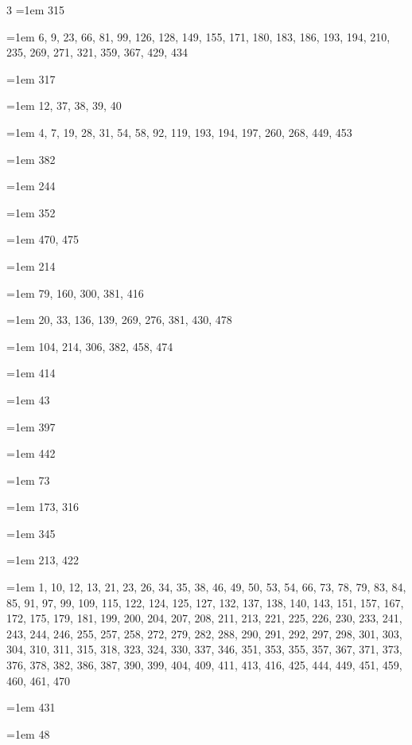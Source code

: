 \begin{multicols}{3}
\hangindent=1em  315\par
\hangindent=1em  6, 9, 23, 66, 81, 99, 126, 128, 149, 155, 171, 180, 183, 186, 193, 194, 210, 235, 269, 271, 321, 359, 367, 429, 434\par
\hangindent=1em  317\par
\hangindent=1em  12, 37, 38, 39, 40\par
\hangindent=1em  4, 7, 19, 28, 31, 54, 58, 92, 119, 193, 194, 197, 260, 268, 449, 453\par
\hangindent=1em  382\par
\hangindent=1em  244\par
\hangindent=1em  352\par
\hangindent=1em  470, 475\par
\hangindent=1em  214\par
\hangindent=1em  79, 160, 300, 381, 416\par
\hangindent=1em  20, 33, 136, 139, 269, 276, 381, 430, 478\par
\hangindent=1em  104, 214, 306, 382, 458, 474\par
\hangindent=1em  414\par
\hangindent=1em  43\par
\hangindent=1em  397\par
\hangindent=1em  442\par
\hangindent=1em  73\par
\hangindent=1em  173, 316\par
\hangindent=1em  345\par
\hangindent=1em  213, 422\par
\hangindent=1em  1, 10, 12, 13, 21, 23, 26, 34, 35, 38, 46, 49, 50, 53, 54, 66, 73, 78, 79, 83, 84, 85, 91, 97, 99, 109, 115, 122, 124, 125, 127, 132, 137, 138, 140, 143, 151, 157, 167, 172, 175, 179, 181, 199, 200, 204, 207, 208, 211, 213, 221, 225, 226, 230, 233, 241, 243, 244, 246, 255, 257, 258, 272, 279, 282, 288, 290, 291, 292, 297, 298, 301, 303, 304, 310, 311, 315, 318, 323, 324, 330, 337, 346, 351, 353, 355, 357, 367, 371, 373, 376, 378, 382, 386, 387, 390, 399, 404, 409, 411, 413, 416, 425, 444, 449, 451, 459, 460, 461, 470\par
\hangindent=1em  431\par
\hangindent=1em  48\par

\end{multicols}
